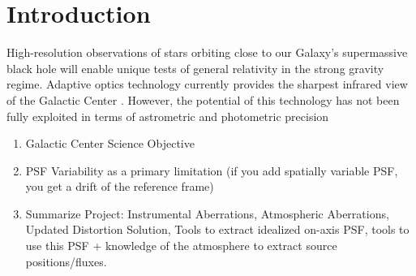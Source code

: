 \section{Introduction}

High-resolution observations of stars orbiting close to our Galaxy's supermassive black hole will enable unique tests of general relativity in the strong gravity regime. Adaptive optics technology currently provides the sharpest infrared view of the Galactic Center \cite{Ghez_2005}. However, the potential of this technology has not been fully exploited in terms of astrometric and photometric precision

\begin{enumerate}
\item Galactic Center Science Objective
\item PSF Variability as a primary limitation (if you add spatially variable PSF, you get a drift of the reference frame)
\item Summarize Project: Instrumental Aberrations, Atmospheric Aberrations, Updated Distortion Solution, Tools to extract idealized on-axis PSF, tools to use this PSF + knowledge of the atmosphere to extract source positions/fluxes.
\end{enumerate}



    